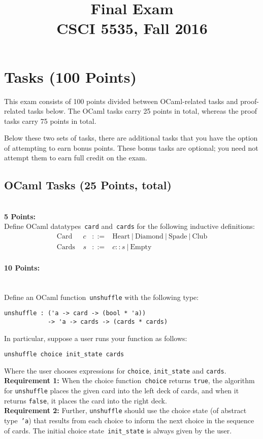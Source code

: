 \documentclass{article}
\title{Final Exam\\
  CSCI 5535, Fall 2016}
\begin{document}
\maketitle

\section*{Tasks (100 Points)}

This exam consists of 100 points divided between OCaml-related tasks
and proof-related tasks below.
%
The OCaml tasks carry 25 points in total, whereas the proof tasks
carry 75 points in total.

Below these two sets of tasks, there are additional tasks that you
have the option of attempting to earn bonus points.  These bonus
tasks are optional; you need not attempt them to earn full credit on
the exam.

\subsection*{OCaml Tasks (25 Points, total)}~\\

\noindent
\textbf{5 Points:}\\
Define OCaml datatypes~\texttt{card} and~\texttt{cards} for the following inductive definitions:
\[\begin{array}{ccll}
\textrm{Card }  & c & ::= & \textrm{Heart} ~|~ \textrm{Diamond} ~|~ \textrm{Spade} ~|~ \textrm{Club}
\\
\textrm{Cards } & s & ::= & c :: s ~|~ \textrm{Empty}
\end{array}
\]

\paragraph{10 Points:}~\\
Define an OCaml function~\texttt{unshuffle} with the following type:
\begin{verbatim}
unshuffle : ('a -> card -> (bool * 'a))
            -> 'a -> cards -> (cards * cards)
\end{verbatim}
In particular, suppose a user runs your function as follows:
\begin{verbatim}
unshuffle choice init_state cards
\end{verbatim}
Where the user chooses expressions for \texttt{choice}, \texttt{init\_state} and \texttt{cards}.
\\[2mm]
\noindent
\textbf{Requirement 1:} When the choice
function~\texttt{choice} returns \texttt{true}, the algorithm for
\texttt{unshuffle} places the given card into the left deck of cards,
and when it returns \texttt{false}, it places the card into the right
deck.
\\[2mm]
\noindent
\textbf{Requirement 2:} Further, \texttt{unshuffle} should use the
choice state (of abstract type~\texttt{'a}) that results from each
choice to inform the next choice in the sequence of cards.
%
The initial choice state~\texttt{init\_state} is always given by the
user.
\end{document}
